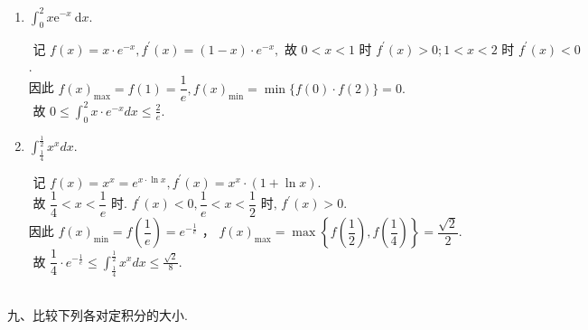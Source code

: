 \documentclass[lang=cn,newtx,10pt,scheme=chinese]{elegantbook}
\begin{document}
\begin{enumerate}
\item $ \displaystyle\int_0^2 x \mathrm{e}^{-x} \mathrm{~d} x .$\\
\begin{solution}
	$\text { 记 } f(x)=x \cdot e^{-x}, f^{\prime}(x)=(1-x) \cdot e^{-x},\text { 故 } 0<x<1 \text { 时 } f^{\prime}(x)>0;1<x<2 \text { 时 } f^{\prime}(x)<0$.\\
	因此 $f(x)_{\max }=f(1)=\dfrac{1}{e} ,f(x)_{\min }=\min \{f(0) \cdot f(2)\}=0 .$\\
	$\text { 故 } 0 \leqslant \displaystyle\int_0^2 x \cdot e^{-x} d x \leqslant \frac{2}{e}.$
\end{solution}
\item $ \displaystyle\int_{\frac{1}{4}}^{\frac{1}{2}} x^x d x .$ \\
\begin{solution}
	$ \text { 记 } f(x)=x^x=e^{x \cdot \ln x},f^{\prime}(x)=x^x \cdot(1+\ln x). $
	$ \text { 故 } \dfrac{1}{4}<x<\dfrac{1}{e} \text { 时. } f^{\prime}(x)<0,\dfrac{1}{e}<x<\dfrac{1}{2} \text { 时, } f^{\prime}(x)>0. $ \\
	 因此 $f(x)_{\min }=f\left(\dfrac{1}{e}\right)=e^{-\frac{1}{e}}$  ，
	$f(x)_{\max }=\max \left\{f\left(\dfrac{1}{2}\right), f\left(\dfrac{1}{4}\right)\right\}=\dfrac{\sqrt{2}}{2}.$ \\
	$\text { 故 } \dfrac{1}{4} \cdot e^{-\frac{1}{e}} \leqslant \displaystyle\int_{\frac{1}{4}}^{\frac{1}{2}} x^x d x \leqslant \frac{\sqrt{2}}{8}.$
\end{solution}
\end{enumerate}
~\\
九、比较下列各对定积分的大小.\\
\end{document}
